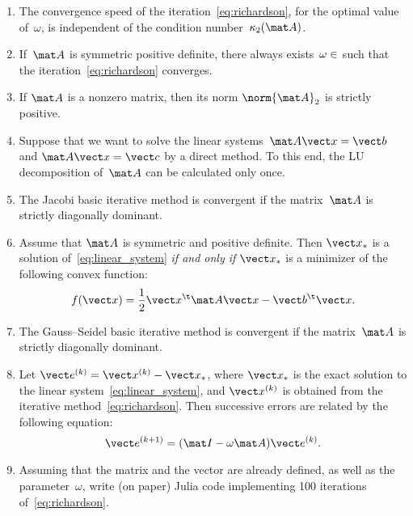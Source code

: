 \documentclass{article}
\begin{document}
\begin{enumerate}
    \item
        The convergence speed of the iteration~\eqref{eq:richardson},
        for the optimal value of~$\omega$,
        is independent of the condition number~$\kappa_2(\mat A)$.

    \item
        If~$\mat A$ is symmetric positive definite,
        there always exists~$\omega \in \real$ such that
        the iteration~\eqref{eq:richardson} converges.

    \item
        If $\mat A$ is a nonzero matrix,
        then its norm $\norm{\mat A}_2$ is strictly positive.

    \item
        Suppose that we want to solve the linear systems~$\mat A \vect x = \vect b$ and $\mat A \vect x = \vect c$ by a direct method.
        To this end, the LU decomposition of~$\mat A$ can be calculated only once.

    \item
        The Jacobi basic iterative method is convergent if the matrix~$\mat A$ is strictly diagonally dominant.

    \item
        Assume that $\mat A$ is symmetric and positive definite.
        Then $\vect x_*$ is a solution of~\eqref{eq:linear_system} \emph{if and only if}
        $\vect x_*$ is a minimizer of the following convex function:
        \[
            f(\vect x) = \frac{1}{2} \vect x^\t \mat A \vect x - \vect b^\t \vect x.
        \]

    \item
        The Gauss--Seidel basic iterative method is convergent if the matrix~$\mat A$ is strictly diagonally dominant.

    \item
        Let $\vect e^{(k)} = \vect x^{(k)} - \vect x_*$,
        where $\vect x_*$ is the exact solution to the linear system~\eqref{eq:linear_system},
        and $\vect x^{(k)}$ is obtained from the iterative method~\eqref{eq:richardson}.
        Then successive errors are related by the following equation:
        \[
            \vect e^{(k+1)} = (\mat I - \omega \mat A) \vect e^{(k)}.
        \]

    \item
        Assuming that the matrix  and the vector  are already defined,
        as well as the parameter~$\omega$,
        write (on paper) Julia code implementing 100 iterations of~\eqref{eq:richardson}.

\end{enumerate}
\end{document}
